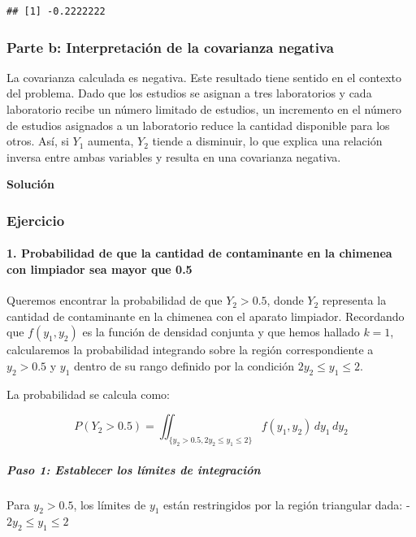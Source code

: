 \documentclass[
]{article}
\begin{document}
\begin{verbatim}
## [1] -0.2222222
\end{verbatim}

\subsubsection{Parte b: Interpretación de la covarianza negativa}\label{parte-b-interpretaciuxf3n-de-la-covarianza-negativa}

La covarianza calculada es negativa. Este resultado tiene sentido en el contexto del problema. Dado que los estudios se asignan a tres laboratorios y cada laboratorio recibe un número limitado de estudios, un incremento en el número de estudios asignados a un laboratorio reduce la cantidad disponible para los otros. Así, si \(Y_1\) aumenta, \(Y_2\) tiende a disminuir, lo que explica una relación inversa entre ambas variables y resulta en una covarianza negativa.

\textbf{Solución}

\subsubsection{Ejercicio}\label{ejercicio}

\paragraph{1. Probabilidad de que la cantidad de contaminante en la chimenea con limpiador sea mayor que 0.5}\label{probabilidad-de-que-la-cantidad-de-contaminante-en-la-chimenea-con-limpiador-sea-mayor-que-0.5-1}

Queremos encontrar la probabilidad de que \(Y_2 > 0.5\), donde \(Y_2\) representa la cantidad de contaminante en la chimenea con el aparato limpiador. Recordando que \(f(y_1, y_2)\) es la función de densidad conjunta y que hemos hallado \(k = 1\), calcularemos la probabilidad integrando sobre la región correspondiente a \(y_2 > 0.5\) y \(y_1\) dentro de su rango definido por la condición \(2y_2 \leq y_1 \leq 2\).

La probabilidad se calcula como:

\[
P(Y_2 > 0.5) = \iint_{\{y_2 > 0.5, 2 y_2 \leq y_1 \leq 2\}} f(y_1, y_2) \, dy_1 \, dy_2
\]

\subparagraph{Paso 1: Establecer los límites de integración}\label{paso-1-establecer-los-luxedmites-de-integraciuxf3n-1}

Para \(y_2 > 0.5\), los límites de \(y_1\) están restringidos por la región triangular dada:
- \(2 y_2 \leq y_1 \leq 2\)
\end{document}
